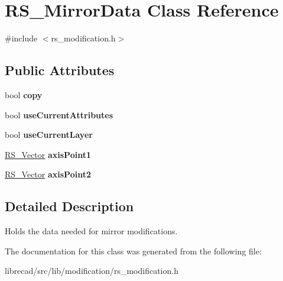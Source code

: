 \hypertarget{classRS__MirrorData}{\section{R\-S\-\_\-\-Mirror\-Data Class Reference}
\label{classRS__MirrorData}
}


{\ttfamily \#include $<$rs\-\_\-modification.\-h$>$}

\subsection*{Public Attributes}
\begin{DoxyCompactItemize}
\item 
\hypertarget{classRS__MirrorData_a167070d77d9d211e3547b14158f71b54}{bool {\bfseries copy}}\label{classRS__MirrorData_a167070d77d9d211e3547b14158f71b54}

\item 
\hypertarget{classRS__MirrorData_a030f522704015c79105495eeec2f7d23}{bool {\bfseries use\-Current\-Attributes}}\label{classRS__MirrorData_a030f522704015c79105495eeec2f7d23}

\item 
\hypertarget{classRS__MirrorData_a1b4b615669333655423dd4bc5e64f530}{bool {\bfseries use\-Current\-Layer}}\label{classRS__MirrorData_a1b4b615669333655423dd4bc5e64f530}

\item 
\hypertarget{classRS__MirrorData_a12e4fcdf004ddd101462ae06ceddddda}{\hyperlink{classRS__Vector}{R\-S\-\_\-\-Vector} {\bfseries axis\-Point1}}\label{classRS__MirrorData_a12e4fcdf004ddd101462ae06ceddddda}

\item 
\hypertarget{classRS__MirrorData_a69753c3f01a6b593103e6166adfbd16b}{\hyperlink{classRS__Vector}{R\-S\-\_\-\-Vector} {\bfseries axis\-Point2}}\label{classRS__MirrorData_a69753c3f01a6b593103e6166adfbd16b}

\end{DoxyCompactItemize}


\subsection{Detailed Description}
Holds the data needed for mirror modifications. 

The documentation for this class was generated from the following file\-:\begin{DoxyCompactItemize}
\item 
librecad/src/lib/modification/rs\-\_\-modification.\-h\end{DoxyCompactItemize}
